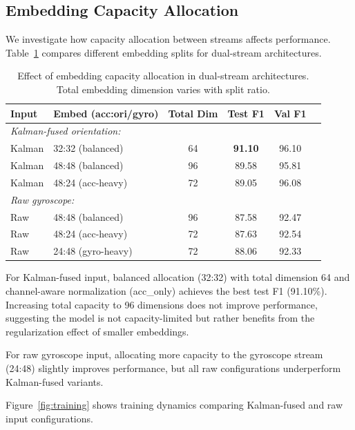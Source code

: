 \subsection{Embedding Capacity Allocation}
\label{subsec:embed_ablation}

We investigate how capacity allocation between streams affects performance. Table~\ref{tab:embed_ratio} compares different embedding splits for dual-stream architectures.

\begin{table}[H]
\caption{Effect of embedding capacity allocation in dual-stream architectures. Total embedding dimension varies with split ratio.}
\label{tab:embed_ratio}
\centering
\begin{tabular}{llcccc}
\toprule
\textbf{Input} & \textbf{Embed (acc:ori/gyro)} & \textbf{Total Dim} & \textbf{Test F1} & \textbf{Val F1} \\
\midrule
\multicolumn{5}{l}{\textit{Kalman-fused orientation:}} \\
Kalman & 32:32 (balanced) & 64 & \textbf{91.10} & 96.10 \\
Kalman & 48:48 (balanced) & 96 & 89.58 & 95.81 \\
Kalman & 48:24 (acc-heavy) & 72 & 89.05 & 96.08 \\
\midrule
\multicolumn{5}{l}{\textit{Raw gyroscope:}} \\
Raw & 48:48 (balanced) & 96 & 87.58 & 92.47 \\
Raw & 48:24 (acc-heavy) & 72 & 87.63 & 92.54 \\
Raw & 24:48 (gyro-heavy) & 72 & 88.06 & 92.33 \\
\bottomrule
\end{tabular}
\end{table}

For Kalman-fused input, balanced allocation (32:32) with total dimension 64 and channel-aware normalization (acc\_only) achieves the best test F1 (91.10\%). Increasing total capacity to 96 dimensions does not improve performance, suggesting the model is not capacity-limited but rather benefits from the regularization effect of smaller embeddings.

For raw gyroscope input, allocating more capacity to the gyroscope stream (24:48) slightly improves performance, but all raw configurations underperform Kalman-fused variants.

Figure~\ref{fig:training} shows training dynamics comparing Kalman-fused and raw input configurations.


